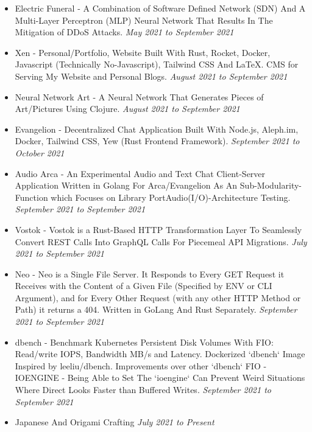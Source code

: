 \documentclass{myresume}
\begin{document}
       \begin{itemize}
     	\item Electric Funeral - A Combination of Software Defined Network (SDN) And A Multi-Layer Perceptron (MLP) Neural Network That Results In The Mitigation of DDoS Attacks. \textit{May 2021 to September 2021}
     	\item Xen - Personal/Portfolio, Website Built With Rust, Rocket, Docker, Javascript (Technically No-Javascript), Tailwind CSS And \LaTeX{}. CMS for Serving My Website and Personal Blogs. \textit{August 2021 to September 2021}
     	\item Neural Network Art -  A Neural Network That Generates Pieces of Art/Pictures Using Clojure. \textit{August 2021 to September 2021}
     	\item Evangelion - Decentralized Chat Application Built With Node.js, Aleph.im, Docker, Tailwind CSS, Yew (Rust Frontend Framework). \textit{September 2021 to October 2021}
     	\item Audio Arca - An Experimental Audio and Text Chat Client-Server Application Written in Golang For Arca/Evangelion As An Sub-Modularity-Function which Focuses on Library PortAudio(I/O)-Architecture Testing. \textit{September 2021 to September 2021}
     	\item Vostok - Vostok is a Rust-Based HTTP Transformation Layer To Seamlessly Convert REST Calls Into GraphQL Calls For Piecemeal API Migrations. \textit {July 2021 to September 2021}
     	\item Neo - Neo is a Single File Server. It Responds to Every GET Request it Receives with the Content of a Given File (Specified by ENV or CLI Argument), and for Every Other Request (with any other HTTP Method or Path) it returns a 404. Written in GoLang And Rust Separately. \textit {September 2021 to September 2021}
     	\item dbench - Benchmark Kubernetes Persistent Disk Volumes With FIO: Read/write IOPS, Bandwidth MB/s and Latency. Dockerized `dbench` Image Inspired by leeliu/dbench. Improvements over other `dbench` FIO - IOENGINE - Being Able to Set The `ioengine` Can Prevent Weird Situations Where Direct Looks Faster than Buffered Writes. \textit{September 2021 to September 2021}    	
       \end{itemize}   
 
        \begin{itemize}
                \item Japanese And Origami Crafting \textit{July 2021 to Present}
        \end{itemize}
\end{document}
